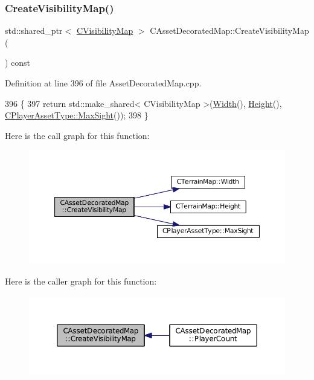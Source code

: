 \subsubsection{\texorpdfstring{Create\+Visibility\+Map()}{CreateVisibilityMap()}}
{\footnotesize\ttfamily std\+::shared\+\_\+ptr$<$ \hyperlink{classCVisibilityMap}{C\+Visibility\+Map} $>$ C\+Asset\+Decorated\+Map\+::\+Create\+Visibility\+Map (\begin{DoxyParamCaption}{ }\end{DoxyParamCaption}) const}



Definition at line 396 of file Asset\+Decorated\+Map.\+cpp.


\begin{DoxyCode}
396                                                                              \{
397     \textcolor{keywordflow}{return} std::make\_shared< CVisibilityMap >(\hyperlink{classCTerrainMap_a34cb754aa9b26e85a73377159f2527d7}{Width}(), \hyperlink{classCTerrainMap_ae5e4bf6507e0e3e9ac0322b43eed8a7a}{Height}(), 
      \hyperlink{classCPlayerAssetType_a1c1648ef0fdd2d112508c2ef9b7b70d1}{CPlayerAssetType::MaxSight}());
398 \}
\end{DoxyCode}
Here is the call graph for this function\+:\nopagebreak
\begin{figure}[H]
\begin{center}
\leavevmode
\includegraphics[width=350pt]{classCAssetDecoratedMap_aa05e81ec37b4217053e8de050e47dba7_cgraph}
\end{center}
\end{figure}
Here is the caller graph for this function\+:\nopagebreak
\begin{figure}[H]
\begin{center}
\leavevmode
\includegraphics[width=350pt]{classCAssetDecoratedMap_aa05e81ec37b4217053e8de050e47dba7_icgraph}
\end{center}
\end{figure}
\hypertarget{classCAssetDecoratedMap_a9d0fa2b32e4e8add6da83a7ebcfab6d8}{}\label{classCAssetDecoratedMap_a9d0fa2b32e4e8add6da83a7ebcfab6d8} 

